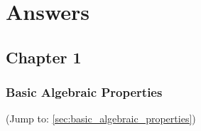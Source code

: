 \documentclass[11pt, oneside]{book}
\begin{document}


\chapter*{Answers}\label{chapter:answers}

\fontsize{9}{11}\selectfont

\section*{Chapter 1} %
\label{sec:chapter_1}

\subsection*{Basic Algebraic Properties} %
\label{sub:basic_algebraic_properties}

(Jump to: \cref{sec:basic_algebraic_properties})
\end{document}
